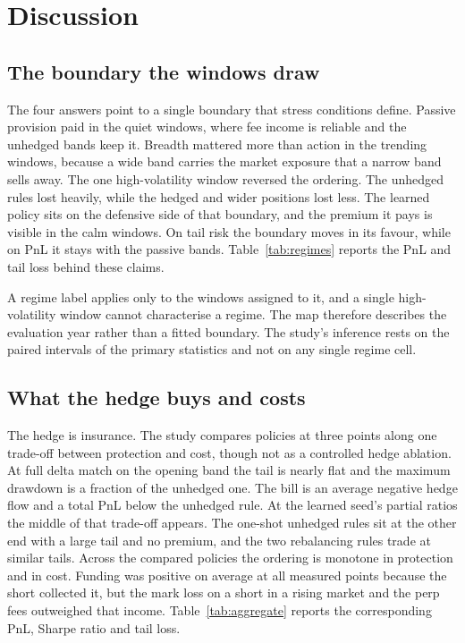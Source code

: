 \section{Discussion}
\label{sec:discussion}

\subsection{The boundary the windows draw}

The four answers point to a single boundary that stress conditions define.
Passive provision paid in the quiet windows, where fee income is reliable and
the unhedged bands keep it. Breadth mattered more than action in the trending
windows, because a wide band carries the market exposure that a narrow band
sells away. The one high-volatility window reversed the ordering. The unhedged
rules lost heavily, while the hedged and wider positions lost less. The learned
policy sits on the defensive side of that boundary, and the premium it pays is
visible in the calm windows. On tail risk the boundary moves in its favour,
while on PnL it stays with the passive bands. Table~\ref{tab:regimes} reports
the PnL and tail loss behind these claims.

A regime label applies only to the windows assigned to it, and a single
high-volatility window cannot characterise a regime. The map therefore
describes the evaluation year rather than a fitted boundary. The study's
inference rests on the paired intervals of the primary statistics and not on
any single regime cell.

\subsection{What the hedge buys and costs}

The hedge is insurance. The study compares policies at three points along one
trade-off between protection and cost, though not as a controlled hedge
ablation. At full delta match on the opening band the tail is nearly flat and
the maximum drawdown is a fraction of the unhedged one. The bill is an average
negative hedge flow and a total PnL below the unhedged rule. At the learned
seed's partial ratios the middle of that trade-off appears. The one-shot
unhedged rules sit at the other end with a large tail and no premium, and the
two rebalancing rules trade at similar tails. Across the compared policies the
ordering is monotone in protection and in cost. Funding was positive on average
at all measured points because the short collected it, but the mark loss on a
short in a rising market and the perp fees outweighed that income.
Table~\ref{tab:aggregate} reports the corresponding PnL, Sharpe ratio and tail
loss.

